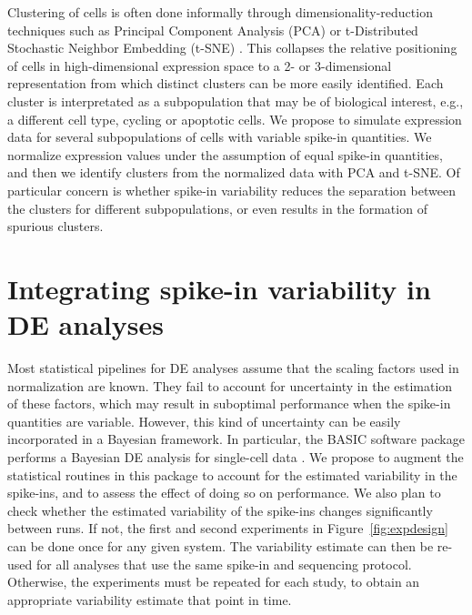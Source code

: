 \documentclass{article}
\begin{document}
Clustering of cells is often done informally through dimensionality-reduction techniques such as Principal Component Analysis (PCA) or t-Distributed Stochastic Neighbor Embedding (t-SNE) \cite{van2008visualizing,julia2015sincell}.
This collapses the relative positioning of cells in high-dimensional expression space to a 2- or 3-dimensional representation from which distinct clusters can be more easily identified. 
Each cluster is interpretated as a subpopulation that may be of biological interest, e.g., a different cell type, cycling or apoptotic cells.
We propose to simulate expression data for several subpopulations of cells with variable spike-in quantities.
We normalize expression values under the assumption of equal spike-in quantities, and then we identify clusters from the normalized data with PCA and t-SNE.
Of particular concern is whether spike-in variability reduces the separation between the clusters for different subpopulations, or even results in the formation of spurious clusters.

\section{Integrating spike-in variability in DE analyses}
Most statistical pipelines for DE analyses assume that the scaling factors used in normalization are known.
They fail to account for uncertainty in the estimation of these factors, which may result in suboptimal performance when the spike-in quantities are variable.
However, this kind of uncertainty can be easily incorporated in a Bayesian framework.
In particular, the BASIC software package performs a Bayesian DE analysis for single-cell data \cite{cata?}.
We propose to augment the statistical routines in this package to account for the estimated variability in the spike-ins, and to assess the effect of doing so on performance.
We also plan to check whether the estimated variability of the spike-ins changes significantly between runs.
If not, the first and second experiments in Figure~\ref{fig:expdesign} can be done once for any given system.
The variability estimate can then be re-used for all analyses that use the same spike-in and sequencing protocol.
Otherwise, the experiments must be repeated for each study, to obtain an appropriate variability estimate that point in time.



{\small


}
\end{document}
